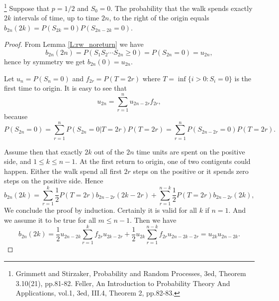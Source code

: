 \begin{theorem}
\footnote{Grimmett and Stirzaker, Probability and Random Processes, 3ed, 
  Theorem 3.10(21), pp.81-82. Feller, An Introduction to Probability Theory And 
  Applications, vol.1, 3ed, III.4, Theorem 2, pp.82-83.}
Suppose that $p=1/2$ and $S_0=0$. The probability that the walk spends exactly 
$2k$ intervals of time, up to time $2n$, to the right of the origin equals
$b_{2n}(2k)=P(S_{2k}=0) P(S_{2n-2k}=0)$.
\end{theorem}
\begin{proof}
From Lemma \ref{L:rw_noreturn} we have
\[
  b_{2n}(2n)=P(S_1 S_2 \cdots S_{2n}\ge 0) = P(S_{2n}=0) =u_{2n},  
\]
hence by symmetry we get $b_{2n}(0)=u_{2n}$.

Let $u_n=P(S_n=0)$ and $f_{2r}=P(T=2r)$ where $T=\inf\{i>0:S_i=0\}$ is the first 
time to origin. It is easy to see that
\[
  u_{2n}=\sum_{r=1}^n u_{2n-2r} f_{2r},
\]
because
\[
  P(S_{2n}=0) = \sum_{r=1}^n P(S_{2n}=0|T=2r) P(T=2r)
              = \sum_{r=1}^n P(S_{2n-2r}=0) P(T=2r).
\]

Assume then that exactly $2k$ out of the $2n$ time units are spent on the 
positive side, and $1\le k\le n-1$.  At the first return to origin, one of 
two contigents could happen. Either the walk spend all first $2r$ steps on 
the positive or it spends zero steps on the positive side.
Hence
\[
  b_{2n}(2k)=\sum_{r=1}^k \frac{1}{2} P(T=2r) b_{2n-2r}(2k-2r)
             + \sum_{r=1}^{n-k} \frac{1}{2} P(T=2r) b_{2n-2r}(2k),
\]
We conclude the proof by induction. Certainly it is valid for all $k$ if $n=1$.
And we assume it to be true for all $m\le n-1$. Then we have
\[
  b_{2n}(2k) = \frac{1}{2} u_{2n-2k} \sum_{r=1}^k f_{2r} u_{2k-2r}
                + \frac{1}{2} u_{2k} \sum_{r=1}^{n-k} f_{2r} u_{2n-2k-2r}
              = u_{2k} u_{2n-2k}.
\]
\end{proof}
